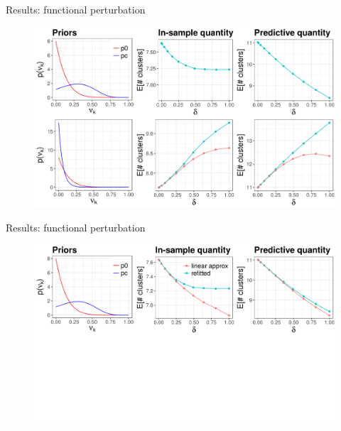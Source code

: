 \documentclass[10pt]{beamer}\usepackage[]{graphicx}\usepackage[]{color}
\newenvironment{knitrout}{}{} %
\begin{document}
\begin{frame}{Results: functional perturbation}
\begin{figure}
\centering
\begin{knitrout}
\color{fgcolor}
{\centering \includegraphics[width=0.98\linewidth,height=0.588\linewidth]{masked_results_fig/functional_sens_plot_thresh0_refit_only-1} 
}
\end{knitrout}
\end{figure}
\end{frame}

\begin{frame}{Results: functional perturbation}
\begin{figure}
\centering
\begin{knitrout}
\color{fgcolor}
{\centering \includegraphics[width=0.98\linewidth,height=0.588\linewidth]{masked_results_fig/func_sens_masked2} 
}
\end{knitrout}
\end{figure}
\end{frame}
\end{document}
